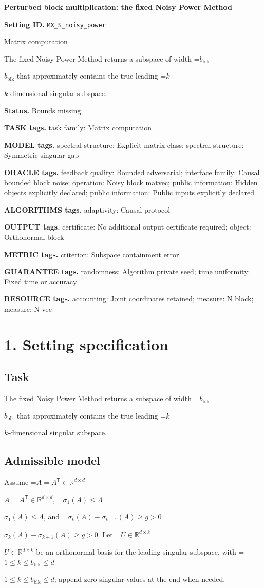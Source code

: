 \documentclass[10pt,a4paper]{article}
\newcommand{\AtlasMath}[1]{\par\begingroup\centering\setbox0=\hbox{$\displaystyle #1$}\ifdim\wd0>1.4\linewidth\typeout{ATLAS WIDE FORMULA: \the\wd0}\fi\ifdim\wd0>\linewidth\resizebox{\linewidth}{!}{\box0}\else\box0\fi\par\endgroup}
\newcommand{\AtlasInlineMath}[1]{\begingroup\setbox0=\hbox{$#1$}\ifdim\wd0>.4\linewidth\endgroup\AtlasMath{#1}\else\endgroup$#1$\fi}
\begin{document}
\raggedright

{\LARGE\bfseries\sffamily\color{AtlasNavy} Perturbed block multiplication: the fixed Noisy Power Method\par}\vspace{5pt}
\textbf{Setting ID.} \texttt{MX\_\allowbreak{}S\_\allowbreak{}noisy\_\allowbreak{}power}

Matrix computation

The fixed Noisy Power Method returns a subspace of width \AtlasInlineMath{b_{\mathrm{blk}}} that approximately contains the true leading \AtlasInlineMath{k}-dimensional singular subspace.

\textbf{Status.} Bounds missing

\textbf{TASK tags.} task family: Matrix computation

\textbf{MODEL tags.} spectral structure: Explicit matrix class; spectral structure: Symmetric singular gap

\textbf{ORACLE tags.} feedback quality: Bounded adversarial; interface family: Causal bounded block noise; operation: Noisy block matvec; public information: Hidden objects explicitly declared; public information: Public inputs explicitly declared

\textbf{ALGORITHMS tags.} adaptivity: Causal protocol

\textbf{OUTPUT tags.} certificate: No additional output certificate required; object: Orthonormal block

\textbf{METRIC tags.} criterion: Subspace containment error

\textbf{GUARANTEE tags.} randomness: Algorithm private seed; time uniformity: Fixed time or accuracy

\textbf{RESOURCE tags.} accounting: Joint coordinates retained; measure: N block; measure: N vec

\section{1. Setting specification}
\subsection{Task}
The fixed Noisy Power Method returns a subspace of width \AtlasInlineMath{b_{\mathrm{blk}}} that approximately contains the true leading \AtlasInlineMath{k}-dimensional singular subspace.

\subsection{Admissible model}
Assume \AtlasInlineMath{A=A^{\mathsf T}\in\mathbb{R}^{d\times d}}, \AtlasInlineMath{\sigma_1(A)\le\Lambda}, and \AtlasInlineMath{\sigma_k(A)-\sigma_{k+1}(A)\ge g>0}. Let \AtlasInlineMath{U\in\mathbb{R}^{d\times k}} be an orthonormal basis for the leading singular subspace, with \AtlasInlineMath{1\le k\le b_{\mathrm{blk}}\le d}; append zero singular values at the end when needed.
\end{document}
